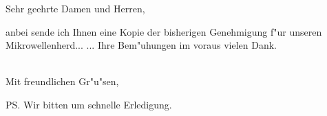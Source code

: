 %
%
%
%
%
%





\subject{\textbf{Betrieb eines Mikrowellensenders}}

\opening{Sehr geehrte Damen und Herren,}
anbei sende ich Ihnen eine Kopie der bisherigen Genehmigung f"ur
unseren Mikrowellenherd...
... Ihre Bem"uhungen im voraus vielen Dank.\\\\


\closing{Mit freundlichen Gr"u"sen,}



\ps{Wir bitten um schnelle Erledigung.}



